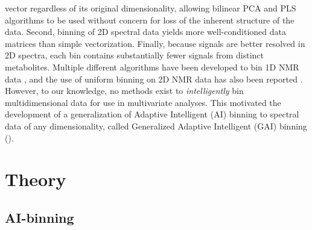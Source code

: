 \begin{doublespace}
vector regardless of its original dimensionality, allowing bilinear PCA and
PLS algorithms to be used without concern for loss of the inherent structure
of the data. Second, binning of 2D spectral data yields more well-conditioned
data matrices than simple vectorization. Finally, because signals are better
resolved in 2D spectra, each bin contains substantially fewer signals from
distinct metabolites. Multiple different algorithms have been developed to
bin 1D NMR data \cite{
  anderson:metab2008,
  anderson:metab2011,
  davis:cils2007,
  demeyer:anchem2008,
  sousa:cils2013}, and the use of uniform binning on 2D NMR data has also been
reported \cite{van:jpr2008}. However, to our knowledge, no methods
exist to {\it intelligently} bin multidimensional data for use in multivariate
analyses. This motivated the development of a generalization of Adaptive
Intelligent (AI) binning \cite{demeyer:anchem2008} to spectral data
of any dimensionality, called Generalized Adaptive Intelligent (GAI) binning
().
\end{doublespace}

\section{Theory}

\subsection{AI-binning}

